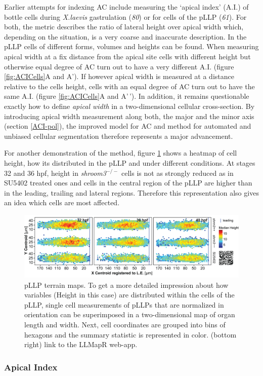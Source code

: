 \documentclass[10pt, b5paper, singlespacinge, twoside]{reedthesis} %
\theoremstyle{definition}
\theoremstyle{definition}
\theoremstyle{definition}
\theoremstyle{remark}
\begin{document}
Earlier attempts for indexing AC include measuring the `apical index' (A.I.) of bottle cells during \emph{X.laevis} gastrulation (\emph{80}) or for cells of the pLLP (\emph{61}). For both, the metric describes the ratio of lateral height over apical width which, depending on the situation, is a very coarse and inaccurate description. In the pLLP cells of different forms, volumes and heights can be found. When measuring apical width at a fix distance from the apical site cells with different height but otherwise equal degree of AC turn out to have a very different A.I. (figure \ref{fig:ACICells}A and A'). If however apical width is measured at a distance relative to the cells height, cells with an equal degree of AC turn out to have the same A.I. (figure \ref{fig:ACICells}A and A'\,'). In addition, it remains questionable exactly how to define \emph{apical width} in a two-dimensional cellular cross-section. By introducing apical width measurement along both, the major and the minor axis (section \ref{ACI-pol}), the improved model for AC and method for automated and unbiased cellular segmentation therefore represents a major advancement.

For another demonstration of the method, figure \ref{fig:dismap} shows a heatmap of cell height, how its distributed in the pLLP and under different conditions. At stages 32 and 36 hpf, height in \emph{shroom3}\(^{-/-}\) cells is not as strongly reduced as in SU5402 treated ones and cells in the central region of the pLLP are higher than in the leading, trailing and lateral regions. Therefore this representation also gives an idea which cells are most affected.


\begin{figure}[H]

{\centering \includegraphics[width=0.95\linewidth]{figures/summary/methodology_mapr} 

}

\caption[pLLP Maps]{pLLP terrain maps. To get a more detailed impression about how variables (Height in this case) are distributed within the cells of the pLLP, single cell measurements of pLLPs that are normalized in orientation can be superimposed in a two-dimensional map of organ length and width. Next, cell coordinates are grouped into bins of hexagons and the summary statistic is represented in color. (bottom right) link to the LLMapR web-app.}\label{fig:dismap}
\end{figure}
\hypertarget{res-ai}{%
\subsubsection{Apical Index}\label{res-ai}}
\end{document}
